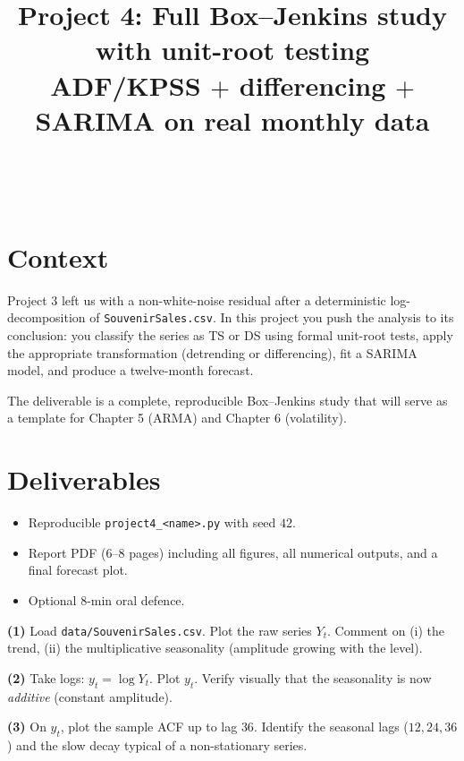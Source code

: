 \documentclass[a4paper,11pt]{article}
\title{Project 4: Full Box--Jenkins study with unit-root testing\\
\large ADF/KPSS $+$ differencing $+$ SARIMA on real monthly data}
\author{\auteurNom\\\auteurEmail\\\auteurInstitution}
\date{\anneeUniversitaire}
\begin{document}
\maketitle

\section*{Context}

Project 3 left us with a non-white-noise residual after a deterministic
log-decomposition of \texttt{SouvenirSales.csv}. In this project you
push the analysis to its conclusion: you classify the series as TS or
DS using formal unit-root tests, apply the appropriate transformation
(detrending or differencing), fit a SARIMA model, and produce a
twelve-month forecast.

The deliverable is a complete, reproducible Box--Jenkins study that
will serve as a template for Chapter 5 (ARMA) and Chapter 6
(volatility).

\section*{Deliverables}
\begin{itemize}
  \item Reproducible \texttt{project4\_<name>.py} with seed $42$.
  \item Report PDF (6--8 pages) including all figures, all numerical
        outputs, and a final forecast plot.
  \item Optional 8-min oral defence.
\end{itemize}

\begin{exercise}
\textbf{(1)} Load \texttt{data/SouvenirSales.csv}. Plot the raw
series $Y_t$. Comment on (i) the trend, (ii) the multiplicative
seasonality (amplitude growing with the level).

\textbf{(2)} Take logs: $y_t = \log Y_t$. Plot $y_t$. Verify
visually that the seasonality is now \emph{additive} (constant
amplitude).

\textbf{(3)} On $y_t$, plot the sample ACF up to lag $36$. Identify
the seasonal lags ($12, 24, 36$) and the slow decay typical of a
non-stationary series.
\end{exercise}
\end{document}
